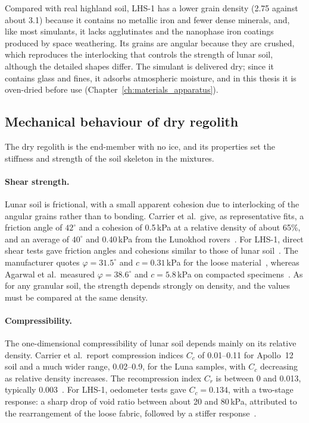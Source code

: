 Compared with real highland soil, LHS-1 has a lower grain density (2.75 against about 3.1) because it contains no metallic iron and fewer dense minerals, and, like most simulants, it lacks agglutinates and the nanophase iron coatings produced by space weathering. Its grains are angular because they are crushed, which reproduces the interlocking that controls the strength of lunar soil, although the detailed shapes differ. The simulant is delivered dry; since it contains glass and fines, it adsorbs atmospheric moisture, and in this thesis it is oven-dried before use (Chapter~\ref{ch:materials_apparatus}).

\subsection{Mechanical behaviour of dry regolith}
\label{subsec:dry_regolith}

The dry regolith is the end-member with no ice, and its properties set the stiffness and strength of the soil skeleton in the mixtures.

\paragraph{Shear strength.} Lunar soil is frictional, with a small apparent cohesion due to interlocking of the angular grains rather than to bonding. Carrier et al.\ give, as representative fits, a friction angle of $42^\circ$ and a cohesion of 0.5\,kPa at a relative density of about 65\%, and an average of $40^\circ$ and 0.40\,kPa from the Lunokhod rovers~\cite{carrier1991}. For LHS-1, direct shear tests gave friction angles and cohesions similar to those of lunar soil~\cite{longfox2023}. The manufacturer quotes $\varphi = 31.5^\circ$ and $c = 0.31$\,kPa for the loose material~\cite{exolithLHS1}, whereas Agarwal et al.\ measured $\varphi = 38.6^\circ$ and $c = 5.8$\,kPa on compacted specimens~\cite{agarwal2023}. As for any granular soil, the strength depends strongly on density, and the values must be compared at the same density.

\paragraph{Compressibility.} The one-dimensional compressibility of lunar soil depends mainly on its relative density. Carrier et al.\ report compression indices $C_c$ of 0.01--0.11 for Apollo~12 soil and a much wider range, 0.02--0.9, for the Luna samples, with $C_c$ decreasing as relative density increases. The recompression index $C_r$ is between 0 and 0.013, typically 0.003~\cite{carrier1991}. For LHS-1, oedometer tests gave $C_c = 0.134$, with a two-stage response: a sharp drop of void ratio between about 20 and 80\,kPa, attributed to the rearrangement of the loose fabric, followed by a stiffer response~\cite{agarwal2023}.

